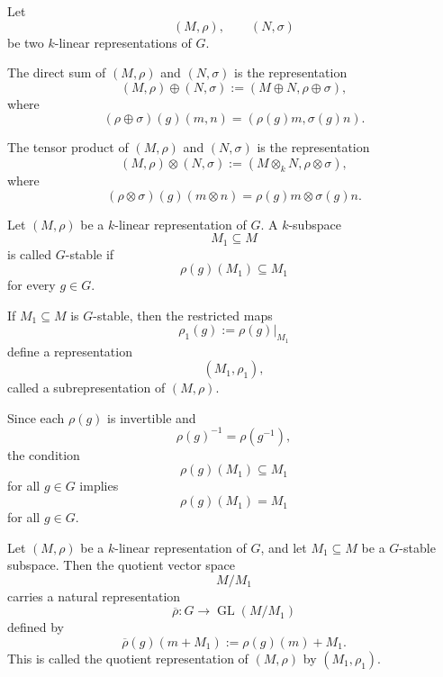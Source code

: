 Let
\[
    (M,\rho),\qquad (N,\sigma)
\]
be two \(k\)-linear representations of \(G\).

\begin{definition}
    The direct sum of \((M,\rho)\) and \((N,\sigma)\) is the representation
    \[
        (M,\rho)\oplus (N,\sigma)
        :=
        (M\oplus N,\rho\oplus\sigma),
    \]
    where
    \[
        (\rho\oplus\sigma)(g)(m,n)
        =
        (\rho(g)m,\sigma(g)n).
    \]
\end{definition}

\begin{definition}
    The tensor product of \((M,\rho)\) and \((N,\sigma)\) is the representation
    \[
        (M,\rho)\otimes (N,\sigma)
        :=
        (M\otimes_k N,\rho\otimes\sigma),
    \]
    where
    \[
        (\rho\otimes\sigma)(g)(m\otimes n)
        =
        \rho(g)m\otimes \sigma(g)n.
    \]
\end{definition}

\begin{definition}[Subrepresentation]
    Let \((M,\rho)\) be a \(k\)-linear representation of \(G\). A \(k\)-subspace
    \[
        M_1\subseteq M
    \]
    is called \(G\)-stable if
    \[
        \rho(g)(M_1)\subseteq M_1
    \]
    for every \(g\in G\).

    If \(M_1\subseteq M\) is \(G\)-stable, then the restricted maps
    \[
        \rho_1(g):=\rho(g)|_{M_1}
    \]
    define a representation
    \[
        (M_1,\rho_1),
    \]
    called a subrepresentation of \((M,\rho)\).
\end{definition}

\begin{remark}
    Since each \(\rho(g)\) is invertible and
    \[
        \rho(g)^{-1}=\rho(g^{-1}),
    \]
    the condition
    \[
        \rho(g)(M_1)\subseteq M_1
    \]
    for all \(g\in G\) implies
    \[
        \rho(g)(M_1)=M_1
    \]
    for all \(g\in G\).
\end{remark}

\begin{definition}
    Let \((M,\rho)\) be a \(k\)-linear representation of \(G\), and let
    \(M_1\subseteq M\) be a \(G\)-stable subspace. Then the quotient vector space
    \[
        M/M_1
    \]
    carries a natural representation
    \[
        \overline{\rho}:G\longrightarrow \operatorname{GL}(M/M_1)
    \]
    defined by
    \[
        \overline{\rho}(g)(m+M_1)
        :=
        \rho(g)(m)+M_1.
    \]
    This is called the quotient representation of \((M,\rho)\) by
    \((M_1,\rho_1)\).
\end{definition}

